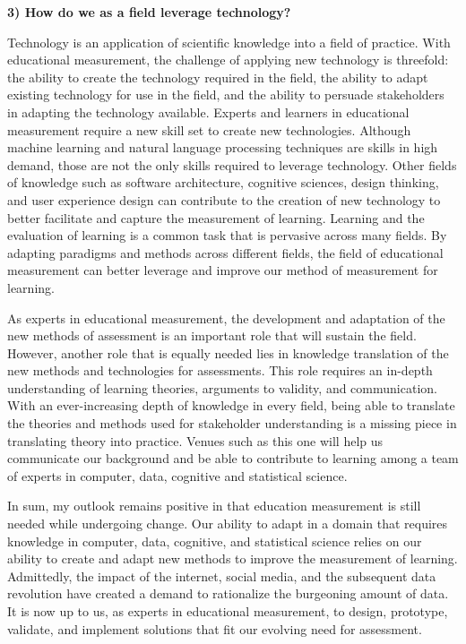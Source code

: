 \documentclass[
]{book}
\begin{document}
\textbf{3) How do we as a field leverage technology?}

Technology is an application of scientific knowledge into a field of practice. With educational measurement, the challenge of applying new technology is threefold: the ability to create the technology required in the field, the ability to adapt existing technology for use in the field, and the ability to persuade stakeholders in adapting the technology available. Experts and learners in educational measurement require a new skill set to create new technologies. Although machine learning and natural language processing techniques are skills in high demand, those are not the only skills required to leverage technology. Other fields of knowledge such as software architecture, cognitive sciences, design thinking, and user experience design can contribute to the creation of new technology to better facilitate and capture the measurement of learning. Learning and the evaluation of learning is a common task that is pervasive across many fields. By adapting paradigms and methods across different fields, the field of educational measurement can better leverage and improve our method of measurement for learning.

As experts in educational measurement, the development and adaptation of the new methods of assessment is an important role that will sustain the field. However, another role that is equally needed lies in knowledge translation of the new methods and technologies for assessments. This role requires an in-depth understanding of learning theories, arguments to validity, and communication. With an ever-increasing depth of knowledge in every field, being able to translate the theories and methods used for stakeholder understanding is a missing piece in translating theory into practice. Venues such as this one will help us communicate our background and be able to contribute to learning among a team of experts in computer, data, cognitive and statistical science.

In sum, my outlook remains positive in that education measurement is still needed while undergoing change. Our ability to adapt in a domain that requires knowledge in computer, data, cognitive, and statistical science relies on our ability to create and adapt new methods to improve the measurement of learning. Admittedly, the impact of the internet, social media, and the subsequent data revolution have created a demand to rationalize the burgeoning amount of data. It is now up to us, as experts in educational measurement, to design, prototype, validate, and implement solutions that fit our evolving need for assessment.
\end{document}
